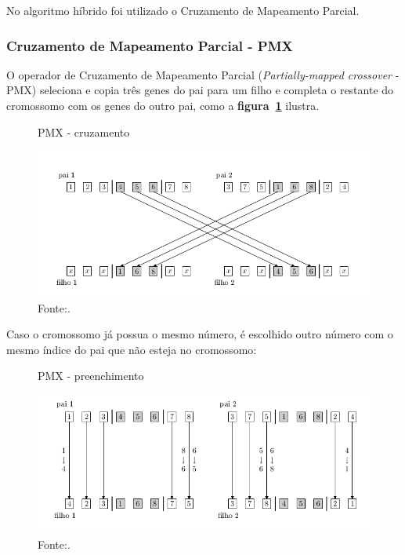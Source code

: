 \documentclass[12pt,openright,a4paper,oneside]{tcc}
\begin{document}
			No algoritmo híbrido foi utilizado o Cruzamento de Mapeamento Parcial.

		\subsubsection{Cruzamento de Mapeamento Parcial - PMX} 
			\label{Spmx}
			O operador de Cruzamento de Mapeamento Parcial (\textit{Partially-mapped crossover} - PMX)  seleciona e copia três genes do pai para um filho e completa o restante do cromossomo com os genes do outro pai, como a \textbf{figura~\ref{pmx}} ilustra.

			\begin{figure}[h]
				\centering
                \caption{PMX - cruzamento}
		        \includegraphics[width = 14cm,keepaspectratio]{img/pmx.png}
		        \caption*{Fonte:\cite{0012-pdf}.}
		        \label{pmx}
	   		\end{figure}

	   		Caso o cromossomo já possua o mesmo número, é escolhido outro número com o mesmo índice do pai que não esteja no cromossomo:
	   		\begin{figure}[h]
				\centering
                \caption{PMX - preenchimento}
		        \includegraphics[width = 14cm,keepaspectratio]{img/pmx2.png}		        
		        \caption*{Fonte:\cite{0012-pdf}.}
		        \label{pmx2}
	   		\end{figure}
\end{document}
